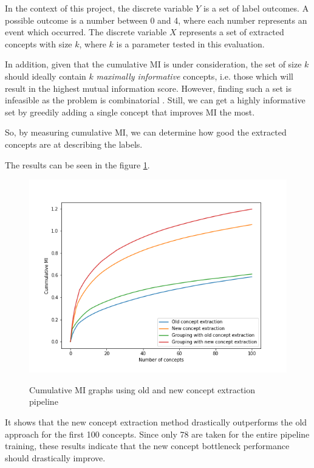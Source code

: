 In the context of this project, the discrete variable $Y$ is a set of label outcomes. A possible outcome is a number between 0 and 4, where each number represents an event which occurred.
The discrete variable $X$ represents a set of extracted concepts with size $k$, where $k$ is a parameter tested in this evaluation.

In addition, given that the cumulative MI is under consideration, the set of size $k$ should ideally contain $k$ \emph{maximally informative} concepts, i.e. those which will result in the highest mutual information score.
However, finding such a set is infeasible as the problem is combinatorial \cite{RefWorks:RefID:16-2021automatic}. Still, we can get a highly informative set by greedily adding a single concept that improves MI the most. 

So, by measuring cumulative MI, we can determine how good the extracted concepts are at describing the labels.

The results can be seen in the figure \ref{cummulative-mi-graphs}.


\begin{figure}[h]
\caption{Cumulative MI graphs using old and new concept extraction pipeline}
\centering
\includegraphics[width=\textwidth]{concept-bottleneck-pipeline/Cummulative MI graphs.png}
\label{cummulative-mi-graphs}
\end{figure}


It shows that the new concept extraction method drastically outperforms the old approach for the first 100 concepts.
Since only 78 are taken for the entire pipeline training, these results indicate that the new concept bottleneck performance should drastically improve.


